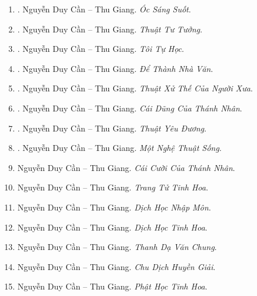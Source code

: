 \documentclass{article}
\begin{document}
\begin{enumerate}
	\item \cite{Can_oc_sang_suot}. {\sc Nguyễn Duy Cần -- Thu Giang}. {\it Óc Sáng Suốt}.\hfill{\sf[done]}

	\item \cite{Can_thuat_tu_tuong}. {\sc Nguyễn Duy Cần -- Thu Giang}. {\it Thuật Tư Tưởng}.\hfill{\sf[done]}

	\item \cite{Can_tu_hoc}. {\sc Nguyễn Duy Cần -- Thu Giang}. {\it Tôi Tự Học}.\hfill{\sf[done]}

	\item \cite{Can_nha_van}. {\sc Nguyễn Duy Cần -- Thu Giang}. {\it Để Thành Nhà Văn}.\hfill{\sf[done]}

	\item \cite{Can_thuat_xu_the}. 	{\sc Nguyễn Duy Cần -- Thu Giang}. {\it Thuật Xử Thế Của Người Xưa}.\hfill{\sf[done]}

	\item \cite{Can_dung_thanh_nhan}. {\sc Nguyễn Duy Cần -- Thu Giang}. {\it Cái Dũng Của Thánh Nhân}.\hfill{\sf[done]}

	\item \cite{Can_thuat_yeu_duong}. {\sc Nguyễn Duy Cần -- Thu Giang}. {\it Thuật Yêu Đương}.\hfill{\sf[done]}

	\item \cite{Can_nghe_thuat_song}. {\sc Nguyễn Duy Cần -- Thu Giang}. {\it Một Nghệ Thuật Sống}.\hfill{\sf[done]}

	\item {\sc Nguyễn Duy Cần -- Thu Giang}. {\it Cái Cười Của Thánh Nhân}.

	\item {\sc Nguyễn Duy Cần -- Thu Giang}. {\it Trang Tử Tinh Hoa}.

	\item {\sc Nguyễn Duy Cần -- Thu Giang}. {\it Dịch Học Nhập Môn}.

	\item {\sc Nguyễn Duy Cần -- Thu Giang}. {\it Dịch Học Tinh Hoa}.

	\item {\sc Nguyễn Duy Cần -- Thu Giang}. {\it Thanh Dạ Văn Chung}.

	\item {\sc Nguyễn Duy Cần -- Thu Giang}. {\it Chu Dịch Huyền Giải}.

	\item {\sc Nguyễn Duy Cần -- Thu Giang}. {\it Phật Học Tinh Hoa}.


\end{enumerate}
\end{document}
